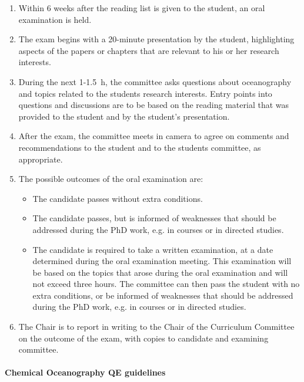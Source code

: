 \begin{enumerate}
\item Within 6 weeks after the reading list is given to the student, an oral
examination is held.

\item The exam begins with a 20-minute presentation by the student,
highlighting aspects of the papers or chapters that are relevant to his or her
research interests.

\item During the next 1-1.5~h, the committee asks questions about oceanography
and topics related to the students research interests. Entry points into
questions and discussions are to be based on the reading material that was
provided to the student and by the student's presentation.

\item After the exam, the committee meets in camera to agree on comments and
recommendations to the student and to the students committee, as appropriate.

\item The possible outcomes of the oral examination are:
\begin{itemize}
\item The candidate passes without extra conditions.

\item The candidate passes, but is informed of weaknesses that should be
addressed during the PhD work, e.g. in courses or in directed studies.

\item The candidate is required to take a written examination, at a date
determined during the oral examination meeting. This examination will be based
on the topics that arose during the oral examination and will not exceed three
hours. The committee can then pass the student with no extra conditions, or be
informed of weaknesses that should be addressed during the PhD work, e.g. in
courses or in directed studies.

\end{itemize}

\item The Chair is to report in writing to the Chair of the Curriculum
Committee on the outcome of the exam, with copies to candidate and examining
committee.

\end{enumerate}


\paragraph{Chemical Oceanography QE guidelines}\hfill

